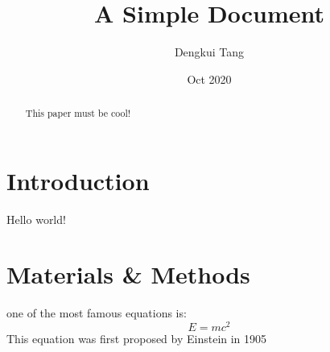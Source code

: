 \documentclass[12pt]{article}
\title{A Simple Document}
\author{Dengkui Tang}
\date{Oct 2020}
\begin{document}
  \maketitle

  \begin{abstract}
    This paper must be cool!
  \end{abstract}

  \section{Introduction}
    Hello world!

  \section{Materials \& Methods}
  one of the most famous equations is:
  \begin{equation}
    E = mc^2
  \end{equation}
  This equation was first proposed by Einstein in 1905
  \cite{einstein1905does}

  
  
\end{document}
